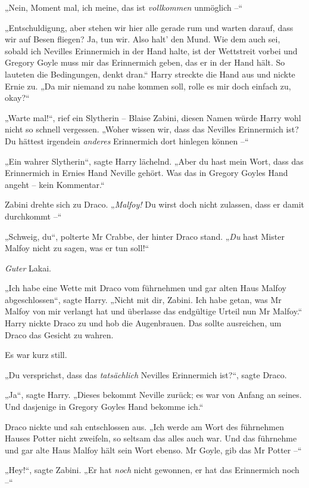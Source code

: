 {„Nein, Moment mal, ich meine, das ist \emph{vollkommen} unmöglich --“

„Entschuldigung, aber stehen wir hier alle gerade rum und warten darauf, dass wir auf Besen fliegen? Ja, tun wir. Also halt' den Mund. Wie dem auch sei, sobald ich Nevilles Erinnermich in der Hand halte, ist der Wettstreit vorbei und Gregory Goyle muss mir das Erinnermich geben, das er in der Hand hält. So lauteten die Bedingungen, denkt dran.“ Harry streckte die Hand aus und nickte Ernie zu. „Da mir niemand zu nahe kommen soll, rolle es mir doch einfach zu, okay?“

„Warte mal!“, rief ein Slytherin -- Blaise Zabini, diesen Namen würde Harry wohl nicht so schnell vergessen. „Woher wissen wir, dass das Nevilles Erinnermich ist? Du hättest irgendein \emph{anderes} Erinnermich dort hinlegen können --“

„Ein wahrer Slytherin“, sagte Harry lächelnd. „Aber du hast mein Wort, dass das Erinnermich in Ernies Hand Neville gehört. Was das in Gregory Goyles Hand angeht -- kein Kommentar.“

Zabini drehte sich zu Draco. „\emph{Malfoy!} Du wirst doch nicht zulassen, dass er damit durchkommt --“

„Schweig, du“, polterte Mr Crabbe, der hinter Draco stand. „\emph{Du} hast Mister Malfoy nicht zu sagen, was er tun soll!“

\emph{Guter} Lakai.

„Ich habe eine Wette mit Draco vom führnehmen und gar alten Haus Malfoy abgeschlossen“, sagte Harry. „Nicht mit dir, Zabini. Ich habe getan, was Mr Malfoy von mir verlangt hat und überlasse das endgültige Urteil nun Mr Malfoy.“ Harry nickte Draco zu und hob die Augenbrauen. Das sollte ausreichen, um Draco das Gesicht zu wahren.

Es war kurz still.

„Du versprichst, dass das \emph{tatsächlich} Nevilles Erinnermich ist?“, sagte Draco.

„Ja“, sagte Harry. „Dieses bekommt Neville zurück; es war von Anfang an seines. Und dasjenige in Gregory Goyles Hand bekomme ich.“

Draco nickte und sah entschlossen aus. „Ich werde am Wort des führnehmen Hauses Potter nicht zweifeln, so seltsam das alles auch war. Und das führnehme und gar alte Haus Malfoy hält sein Wort ebenso. Mr Goyle, gib das Mr Potter --“

„Hey!“, sagte Zabini. „Er hat \emph{noch} nicht gewonnen, er hat das Erinnermich noch --“

}
